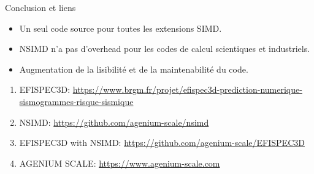 \documentclass[shrink, compress, mathserif, 10pt, xcolor=dvipsnames,
               aspectratio=169]{beamer}
\begin{document}
\begin{frame}{Conclusion et liens}
  \begin{itemize}
    \item
      Un seul code source pour toutes les extensions SIMD.
    \item
      NSIMD n'a pas d'overhead pour les codes de calcul scientiques et
      industriels.
    \item
      Augmentation de la lisibilité et de la maintenabilité du code.  
  \end{itemize}

  \vspace{2em}
  \begin{enumerate}
    \item EFISPEC3D: \url{https://www.brgm.fr/projet/efispec3d-prediction-numerique-sismogrammes-risque-sismique}
    \item NSIMD: \url{https://github.com/agenium-scale/nsimd}
    \item EFISPEC3D with NSIMD: \url{https://github.com/agenium-scale/EFISPEC3D}
    \item AGENIUM SCALE: \url{https://www.agenium-scale.com}
  \end{enumerate}
\end{frame}
\end{document}
